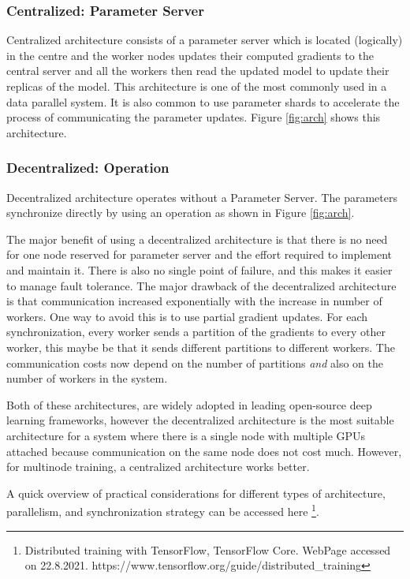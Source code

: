 \subsubsection{Centralized: Parameter Server}
Centralized architecture consists of a parameter server which is located (logically) in the centre and the worker nodes updates their computed gradients to the central server and all the workers then read the updated model to update their replicas of the model. This architecture is one of the most commonly used in a data parallel system. It is also common to use parameter shards to accelerate the process of communicating the parameter updates. Figure \ref{fig:arch} shows this architecture.

\subsubsection{Decentralized:  Operation}
Decentralized architecture operates without a Parameter Server. The parameters synchronize directly by using an  operation as shown in Figure \ref{fig:arch}. 

The major benefit of using a decentralized architecture is that there is no need for one node reserved for parameter server and the effort required to implement and maintain it. There is also no single point of failure, and this makes it easier to manage fault tolerance. The major drawback of the decentralized architecture is that communication increased exponentially with the increase in number of workers. One way to avoid this is to use partial gradient updates. For each synchronization, every worker sends a partition of the gradients to every other worker, this maybe be that it sends different partitions to different workers.  The communication costs now depend on the number of partitions \emph{and} also on the number of workers in the system. 

Both of these architectures, are widely adopted in leading open-source deep learning frameworks, however the decentralized architecture is the most suitable architecture for a system where there is a single node with multiple GPUs attached because communication on the same node does not cost much. However, for multinode training, a centralized architecture works better. 

A quick overview of practical considerations for different types of architecture, parallelism, and synchronization strategy can be accessed here \footnote{Distributed training with TensorFlow, TensorFlow Core. WebPage accessed on 22.8.2021. https://www.tensorflow.org/guide/distributed\_training}. 


